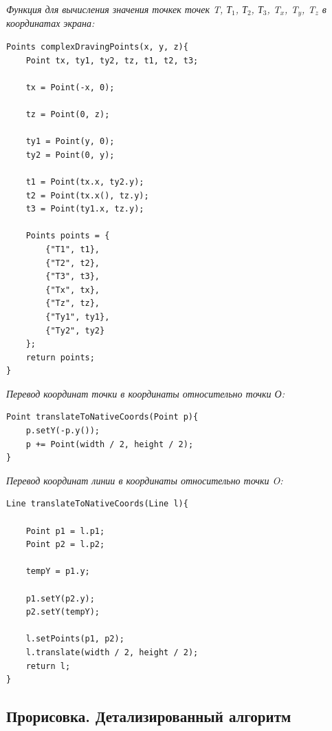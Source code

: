 \documentclass[13pt]{extarticle}
\begin{document}
\emph{Функция для вычисления значения точкек  точек T, Т$_1$, Т$_2$, Т$_3$, T$_x$, T$_y$, T$_z$ в координатах экрана:}
\lstset {language=C++}
\begin{lstlisting}
Points complexDravingPoints(x, y, z){
    Point tx, ty1, ty2, tz, t1, t2, t3;

    tx = Point(-x, 0);

    tz = Point(0, z);

    ty1 = Point(y, 0);
    ty2 = Point(0, y);

    t1 = Point(tx.x, ty2.y);
    t2 = Point(tx.x(), tz.y);
    t3 = Point(ty1.x, tz.y);

    Points points = {
        {"T1", t1},
        {"T2", t2},
        {"T3", t3},
        {"Tx", tx},
        {"Tz", tz},
        {"Ty1", ty1},
        {"Ty2", ty2}
    };
    return points;
}
\end{lstlisting}
\emph{Перевод координат точки в координаты относительно точки О:}
\begin{lstlisting}
Point translateToNativeCoords(Point p){
    p.setY(-p.y());
    p += Point(width / 2, height / 2);
}
\end{lstlisting}
\emph{Перевод координат линии в координаты относительно точки O:}
\begin{lstlisting}
Line translateToNativeCoords(Line l){

    Point p1 = l.p1;
    Point p2 = l.p2;

    tempY = p1.y;

    p1.setY(p2.y);
    p2.setY(tempY);

    l.setPoints(p1, p2);
    l.translate(width / 2, height / 2);
    return l;
}
\end{lstlisting}
\subsection{Прорисовка. Детализированный алгоритм}
\end{document}
